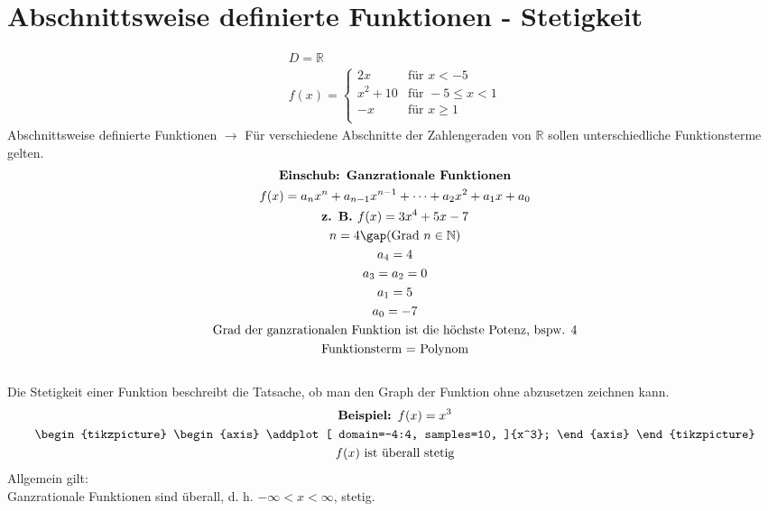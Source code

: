 \section{Abschnittsweise definierte Funktionen - Stetigkeit}
\begin{gather*}
  D = \mathbb{R} \\
  f(x) =
  \begin{cases}
    2x & \text{für } x < -5 \\
    x^2 + 10 & \text{für } -5 \leq x < 1 \\
    -x & \text{für } x \geq 1 \\
  \end{cases}
\end{gather*}
Abschnittsweise definierte Funktionen $\rightarrow$ Für verschiedene Abschnitte der Zahlengeraden von $\mathbb{R}$ sollen unterschiedliche Funktionsterme gelten. \\
\begin{gather*}
  \textbf{Einschub: Ganzrationale Funktionen} \\
  f(x) = a_nx^n + a_{n-1}x^{n-1} + \dots + a_2x^2 + a_1x + a_0 \\
  \textbf{z. B. } f(x) = 3x^4 + 5x - 7 \\
  n = 4 \gap\text{(Grad } n \in \mathbb{N}\text{)} \\ a_4 = 4 \\ a_3 = a_2 = 0 \\ a_1 = 5 \\ a_0 = -7 \\
  \text{Grad der ganzrationalen Funktion ist die höchste Potenz, bspw. 4} \\
  \text{Funktionsterm = Polynom}
\end{gather*} \\
Die Stetigkeit einer Funktion beschreibt die Tatsache, ob man den Graph der Funktion ohne abzusetzen zeichnen kann.
\begin{gather*}
  \textbf{Beispiel: } f(x) = x^3 \\
  \begin{tikzpicture}
    \begin{axis}
      \addplot[
      domain=-4:4,
      samples=10,
      ]{x^3};
    \end{axis}
  \end{tikzpicture} \\
  f(x) \text{ ist überall stetig}
\end{gather*}
Allgemein gilt: \\ Ganzrationale Funktionen sind überall, d. h. $-\infty < x < \infty$, stetig. \\
